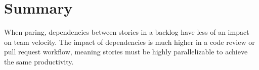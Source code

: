 \documentclass[letterpaper]{article}
\theoremstyle{definition}
\begin{document}
    \section{Summary}\label{sec:summary}

    When paring, dependencies between stories in a backlog have less of an impact on team velocity.
    The impact of dependencies is much higher in a code review or pull request workflow, meaning stories must be
    highly parallelizable to achieve the same productivity.
\end{document}
